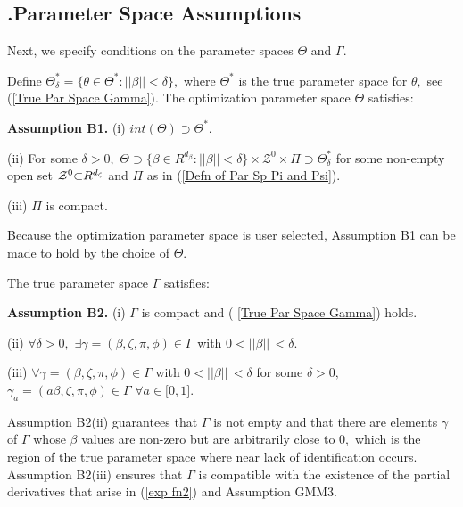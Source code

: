 \documentclass[12pt,titlepage,final,oneside,letterpaper]{article}
\begin{document}
\subsection{\hspace{-0.23in}\textbf{.}\hspace{0.18in}Parameter Space
Assumptions\label{Par Space Subsec}}

\hspace{0.25in}Next, we specify conditions on the parameter spaces $\Theta $
and $\Gamma .$

Define $\Theta _{\delta }^{\ast }=\{\theta \in \Theta ^{\ast }:||\beta
||<\delta \},$ where $\Theta ^{\ast }$ is the true parameter space for $%
\theta ,$ see (\ref{True Par Space Gamma}). The optimization parameter space 
$\Theta $ satisfies:\medskip

\noindent \textbf{Assumption B1.} (i) $int(\Theta )\supset \Theta ^{\ast }.$

\noindent (ii) For some $\delta >0,$ $\Theta \supset \{\beta \in R^{d_{\beta
}}:||\beta ||<\delta \}\times \mathcal{Z}^{0}\times \Pi \supset \Theta
_{\delta }^{\ast }$ for some non-empty open set $\mathcal{Z}^{0}\mathcal{%
\subset }R^{d_{\zeta }}$ and $\Pi $ as in (\ref{Defn of Par Sp Pi and Psi}).

\noindent (iii) $\Pi $ is compact.\medskip

\noindent Because the optimization parameter space is user selected,
Assumption B1 can be made to hold by the choice of $\Theta .$

The true parameter space $\Gamma $ satisfies:\medskip

\noindent \textbf{Assumption B2.} \noindent (i) $\Gamma $ is compact and (%
\ref{True Par Space Gamma}) holds.

\noindent (ii) $\forall \delta >0,$ $\exists \gamma =(\beta ,\zeta ,\pi
,\phi )\in \Gamma $ with $0<||\beta ||\,<\delta .$

\noindent (iii) $\forall \gamma =(\beta ,\zeta ,\pi ,\phi )\in \Gamma $ with 
$0<||\beta ||\,<\delta $ for some $\delta >0,$ $\gamma _{a}=(a\beta ,\zeta
,\pi ,\phi )\in \Gamma $ $\forall a\in \lbrack 0,1].$\medskip

\noindent Assumption B2(ii) guarantees that $\Gamma $ is not empty and that
there are elements $\gamma $ of $\Gamma $ whose $\beta $ values are non-zero
but are arbitrarily close to $0,$ which is the region of the true parameter
space where near lack of identification occurs. Assumption B2(iii) ensures
that $\Gamma $ is compatible with the existence of the partial derivatives
that arise in (\ref{exp fn2}) and Assumption GMM3.\medskip
\end{document}
